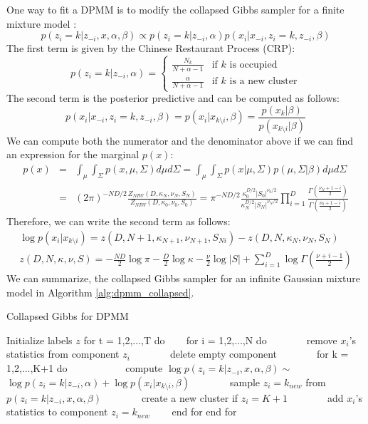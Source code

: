 One way to fit a DPMM is to modify the collapsed Gibbs sampler for a finite mixture model \cite{MurphyML}:
\begin{equation}
    p(z_i=k|z_{-i},x,\alpha,\beta) \propto p(z_i=k|z_{-i},\alpha)p(x_i|x_{-i},z_i=k,z_{-i},\beta)
\end{equation}
The first term is given by the Chinese Restaurant Process (CRP):
\begin{equation}
    p(z_i=k|z_{-i},\alpha) = 
    \begin{cases}
        \frac{N_k}{N+\alpha -1} & \text{if } k \text{ is occupied}\\
        \frac{\alpha}{N+\alpha-1} & \text{if } k \text{ is a new cluster}
    \end{cases}
\end{equation}
The second term is the posterior predictive and can be computed as follows:
\begin{equation}
    p(x_i|x_{-i},z_i=k,z_{-i},\beta) = p(x_i|x_{k\setminus i}, \beta) = \frac{p(x_{k}|\beta)}{p(x_{k\setminus i}|\beta)}
\end{equation}
We can compute both the numerator and the denominator above if we can find an expression for the marginal $p(x)$:
\begin{eqnarray}
    p(x) &=& \int_{\mu} \int_{\Sigma} p(x,\mu,\Sigma) d\mu d\Sigma = \int_{\mu} \int_{\Sigma} p(x|\mu,\Sigma)p(\mu,\Sigma|\beta)d\mu d\Sigma\\
    &=& (2\pi)^{-ND/2}\frac{Z_{NIW}(D,\kappa_N,\nu_N,S_N)}{Z_{NIW}(D,\kappa_0,\nu_0,S_0)} = \pi^{-ND/2}\frac{\kappa_{0}^{D/2}|S_0|^{\nu_0/2}}{\kappa_{N}^{D/2}|S_N|^{\nu_N/2}}\prod_{i=1}^{D}\frac{\Gamma(\frac{\nu_N+1-i}{2})}{\Gamma(\frac{\nu_0+1-i}{2})}
\end{eqnarray}
Therefore, we can write the second term as follows:
\begin{eqnarray}
    \log p(x_i|x_{k\setminus i}) = z(D,N+1,\kappa_{N+1},\nu_{N+1},S_{Ni}) - z(D,N,\kappa_{N},\nu_N,S_N)\\
    z(D,N,\kappa,\nu,S) = -\frac{ND}{2}\log \pi - \frac{D}{2}\log \kappa - \frac{\nu}{2}\log |S| + \sum_{i=1}^{D}\log \Gamma(\frac{\nu+i-1}{2})
\end{eqnarray}
We can summarize, the collapsed Gibbs sampler for an infinite Gaussian mixture model in Algorithm \ref{alg:dpmm_collapsed}.
\begin{algorithm}
\caption{Collapsed Gibbs for DPMM}
\label{alg:dpmm_collapsed}
\begin{algorithmic}[1]
\STATE Initialize labels $z$ 
\STATE for t = 1,2,...,T do 
\STATE ~~~ for i = 1,2,...,N do 
\STATE ~~~ ~~~ remove $x_i$'s statistics from component $z_i$ 
\STATE ~~~ ~~~ delete empty component
\STATE ~~~ ~~~ for k = 1,2,...,K+1 do
\STATE ~~~ ~~~ ~~~ compute $\log p(z_i=k|z_{-i},x,\alpha,\beta) \sim$
\STATE ~~~ ~~~ ~~~ $\log p(z_i = k|z_{-i},\alpha) + \log p(x_i|x_{k\setminus i},\beta)$
\STATE ~~~ ~~~ sample $z_i = k_{new}$ from $p(z_i=k|z_{-i},x,\alpha,\beta)$
\STATE ~~~ ~~~ create a new cluster if $z_i = K+1$
\STATE ~~~ ~~~ add $x_i$'s statistics to component $z_i = k_{new}$ 
\STATE ~~~ end for
\STATE end for
\end{algorithmic}
\end{algorithm}

